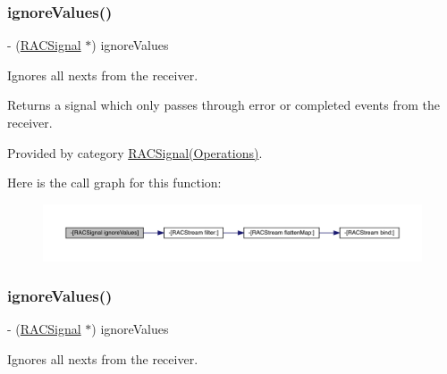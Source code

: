 \subsubsection{\texorpdfstring{ignore\+Values()}{ignoreValues()}\hspace{0.1cm}{\footnotesize\ttfamily [1/3]}}
{\footnotesize\ttfamily -\/ (\mbox{\hyperlink{interface_r_a_c_signal}{R\+A\+C\+Signal}} $\ast$) ignore\+Values \begin{DoxyParamCaption}{ }\end{DoxyParamCaption}}

Ignores all {\ttfamily next}s from the receiver.

Returns a signal which only passes through {\ttfamily error} or {\ttfamily completed} events from the receiver. 

Provided by category \mbox{\hyperlink{category_r_a_c_signal_07_operations_08_a2997862d443d16efa3197facb6a354d1}{R\+A\+C\+Signal(\+Operations)}}.

Here is the call graph for this function\+:\nopagebreak
\begin{figure}[H]
\begin{center}
\leavevmode
\includegraphics[width=350pt]{interface_r_a_c_signal_a2997862d443d16efa3197facb6a354d1_cgraph}
\end{center}
\end{figure}
\mbox{\label{interface_r_a_c_signal_a2997862d443d16efa3197facb6a354d1}} 
\subsubsection{\texorpdfstring{ignore\+Values()}{ignoreValues()}\hspace{0.1cm}{\footnotesize\ttfamily [2/3]}}
{\footnotesize\ttfamily -\/ (\mbox{\hyperlink{interface_r_a_c_signal}{R\+A\+C\+Signal}} $\ast$) ignore\+Values \begin{DoxyParamCaption}{ }\end{DoxyParamCaption}}

Ignores all {\ttfamily next}s from the receiver.

